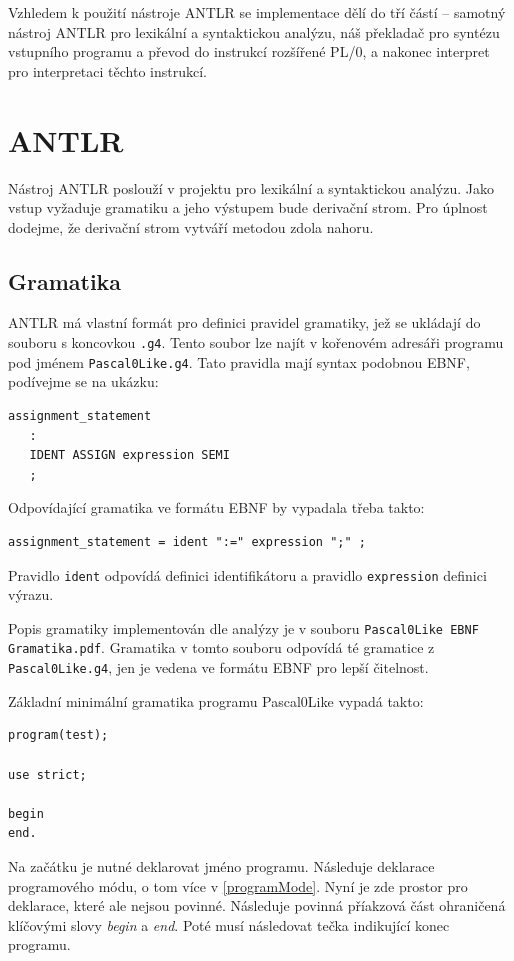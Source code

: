 \documentclass[
12pt,
a4paper,
pdftex,
czech,
titlepage
]{report}
\begin{document}
 Vzhledem k použití nástroje ANTLR se implementace dělí do tří částí -- samotný nástroj ANTLR pro lexikální a syntaktickou analýzu, náš překladač pro syntézu vstupního programu a převod do instrukcí rozšířené PL/0, a nakonec interpret pro interpretaci těchto instrukcí.
 
 \section{ANTLR}
 
 Nástroj ANTLR poslouží v projektu pro lexikální a syntaktickou analýzu. Jako vstup vyžaduje gramatiku a jeho výstupem bude derivační strom. Pro úplnost dodejme, že derivační strom vytváří metodou zdola nahoru.

 
 \subsection{Gramatika} \label{gramatika}
	ANTLR má vlastní formát pro definici pravidel gramatiky, jež se ukládají do souboru s koncovkou \texttt{.g4}. Tento soubor lze najít v kořenovém adresáři programu pod jménem \texttt{Pascal0Like.g4}. Tato pravidla mají syntax podobnou EBNF, podívejme se na ukázku:
\begin{lstlisting}
assignment_statement
   :
   IDENT ASSIGN expression SEMI
   ;
\end{lstlisting}	
Odpovídající gramatika ve formátu EBNF by vypadala třeba takto:
\begin{lstlisting}
assignment_statement = ident ":=" expression ";" ;
\end{lstlisting}	

Pravidlo \texttt{ident} odpovídá definici identifikátoru a pravidlo \texttt{expression} definici výrazu.

Popis gramatiky implementován dle analýzy je v souboru \texttt{Pascal0Like EBNF Gramatika.pdf}. Gramatika v tomto souboru odpovídá té gramatice z \texttt{Pascal0Like.g4}, jen je vedena ve formátu EBNF pro lepší čitelnost.

Základní minimální gramatika programu Pascal0Like vypadá takto:
\begin{lstlisting}
program(test);

use strict;

begin
end.
\end{lstlisting}

Na začátku je nutné deklarovat jméno programu. Následuje deklarace programového módu, o tom více v \ref{programMode}. Nyní je zde prostor pro deklarace, které ale nejsou povinné. Následuje povinná příakzová část ohraničená klíčovými slovy \textit{begin} a \textit{end}. Poté musí následovat tečka indikující konec programu.
\end{document}
